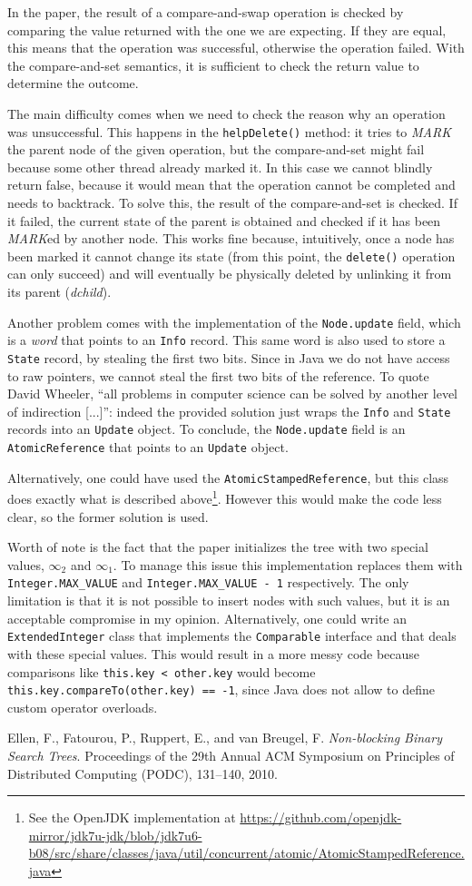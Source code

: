 \documentclass[a4paper,12pt]{article}
\begin{document}
In the paper, the result of a compare-and-swap operation is checked by comparing the value returned with the one we are expecting. If they are equal, this means that the operation was successful, otherwise the operation failed.
With the compare-and-set semantics, it is sufficient to check the return value to determine the outcome.

The main difficulty comes when we need to check the reason why an operation was unsuccessful.
This happens in the \texttt{helpDelete()} method: it tries to \emph{MARK} the parent node of the given operation, but the compare-and-set might fail because some other thread already marked it.
In this case we cannot blindly return false, because it would mean that the operation cannot be completed and needs to backtrack.
To solve this, the result of the compare-and-set is checked.
If it failed, the current state of the parent is obtained and checked if it has been \emph{MARK}ed by another node.
This works fine because, intuitively, once a node has been marked it cannot change its state (from this point, the \texttt{delete()} operation can only succeed) and will eventually be physically deleted by unlinking it from its parent (\emph{dchild}).

Another problem comes with the implementation of the \texttt{Node.update} field, which is a \emph{word} that points to an \texttt{Info} record.
This same word is also used to store a \texttt{State} record, by stealing the first two bits.
Since in Java we do not have access to raw pointers, we cannot steal the first two bits of the reference.
To quote David Wheeler, ``all problems in computer science can be solved by another level of indirection [...]'': indeed the provided solution just wraps the \texttt{Info} and \texttt{State} records into an \texttt{Update} object.
To conclude, the \texttt{Node.update} field is an \texttt{Atomic\-Reference} that points to an \texttt{Update} object.

Alternatively, one could have used the \texttt{AtomicStampedReference}, but this class does exactly what is described above\footnote{See the OpenJDK implementation at \url{https://github.com/openjdk-mirror/jdk7u-jdk/blob/jdk7u6-b08/src/share/classes/java/util/concurrent/atomic/AtomicStampedReference.java}}.
However this would make the code less clear, so the former solution is used.

Worth of note is the fact that the paper initializes the tree with two special values, $\infty_2$ and $\infty_1$. To manage this issue this implementation replaces them with \texttt{Integer.MAX\_VALUE} and \texttt{Integer.MAX\_VALUE - 1} respectively. The only limitation is that it is not possible to insert nodes with such values, but it is an acceptable compromise in my opinion. Alternatively, one could write an \texttt{ExtendedInteger} class that implements the \texttt{Comparable} interface and that deals with these special values. This would result in a more messy code because comparisons like \texttt{this.key < other.key} would become \texttt{this.key.compareTo(other.key) == -1}, since Java does not allow to define custom operator overloads.


\begin{thebibliography}{9}
     Ellen, F., Fatourou, P., Ruppert, E., and van Breugel, F. \emph{Non-blocking Binary Search Trees}. Proceedings of the 29th Annual ACM Symposium on Principles of Distributed Computing (PODC), 131–140, 2010.
\end{thebibliography}
\end{document}
